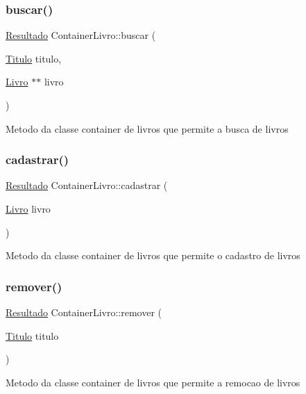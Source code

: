\subsubsection{\texorpdfstring{buscar()}{buscar()}}
{\footnotesize\ttfamily \hyperlink{classResultado}{Resultado} Container\+Livro\+::buscar (\begin{DoxyParamCaption}\item[{\hyperlink{classTitulo}{Titulo}}]{titulo,  }\item[{\hyperlink{classLivro}{Livro} $\ast$$\ast$}]{livro }\end{DoxyParamCaption})}

Metodo da classe container de livros que permite a busca de livros \mbox{\label{classContainerLivro_a85b97c6680de42dd786b4fbe9f9969a5}} 
\subsubsection{\texorpdfstring{cadastrar()}{cadastrar()}}
{\footnotesize\ttfamily \hyperlink{classResultado}{Resultado} Container\+Livro\+::cadastrar (\begin{DoxyParamCaption}\item[{\hyperlink{classLivro}{Livro}}]{livro }\end{DoxyParamCaption})}

Metodo da classe container de livros que permite o cadastro de livros \mbox{\label{classContainerLivro_a5f38b5d1a6b133f28860d8039fa412cd}} 
\subsubsection{\texorpdfstring{remover()}{remover()}}
{\footnotesize\ttfamily \hyperlink{classResultado}{Resultado} Container\+Livro\+::remover (\begin{DoxyParamCaption}\item[{\hyperlink{classTitulo}{Titulo}}]{titulo }\end{DoxyParamCaption})}

Metodo da classe container de livros que permite a remocao de livros \mbox{\label{classContainerLivro_a97f49d9f9ef66437986b5d947db126d6}} 
